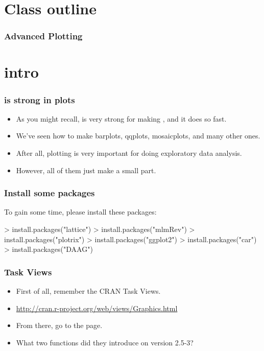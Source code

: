 




\usepackage{Sweave}


\begin{frame}[allowframebreaks]
  \titlepage
\end{frame}

\section*{Class outline}

\begin{frame}[allowframebreaks]
  \frametitle{Advanced Plotting}
  \tableofcontents[hideallsubsections]
\end{frame}

\section{intro}

\begin{frame}[allowframebreaks]
  \frametitle{ is strong in plots}
  \begin{itemize}
  \item As you might recall,  is very strong for making , and it does so fast.
  \item We've seen how to make barplots, qqplots, mosaicplots, and many other ones.
  \item After all, plotting is very important for doing \alert{exploratory data analysis}.
  \item However, all of them just make a small part.
  \end{itemize}
\end{frame}

\begin{frame}
  \frametitle{Install some packages}
  To gain some time, please install these packages:
\begin{Schunk}
\begin{Sinput}
> install.packages("lattice")
> install.packages("mlmRev")
> install.packages("plotrix")
> install.packages("ggplot2")
> install.packages("car")
> install.packages("DAAG")
\end{Sinput}
\end{Schunk}
\end{frame}

\begin{frame}[allowframebreaks]
  \frametitle{Task Views}
  \begin{itemize}
  \item First of all, remember the CRAN \alert{Task Views}.
  \item \url{http://cran.r-project.org/web/views/Graphics.html}
  \item From there, go to the  page.
  \item What two functions did they introduce on version 2.5-3?
  \end{itemize}
\end{frame}

